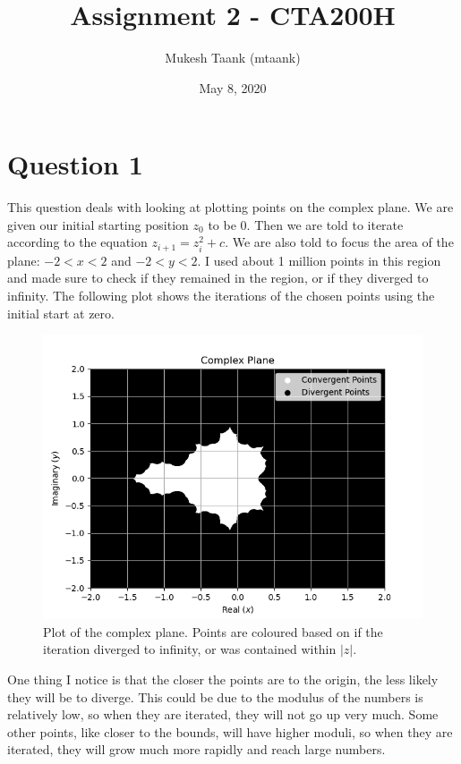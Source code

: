 \documentclass{article}
\title{Assignment 2 - CTA200H}
\author{Mukesh Taank (mtaank)}
\date{May 8, 2020}
\begin{document}
\maketitle

\section*{Question 1}

This question deals with looking at plotting points on the complex plane. 
We are given our initial starting position $z_0$ to be 0.
Then we are told to iterate according to the equation $z_{i + 1} = z_i^2 + c$.
We are also told to focus the area of the plane: $-2 < x < 2$ and $-2 < y < 2$.
I used about 1 million points in this region and made sure to check if they remained in the region, or if they diverged to infinity.
The following plot shows the iterations of the chosen points using the initial start at zero.

\begin{figure}[!htb]
    \centering
    \includegraphics[scale=0.9]{Q1_updated plot.png}
    \caption{Plot of the complex plane. Points are coloured based on if the iteration diverged to infinity, or was contained within $|z|$.}
    \label{fig:Q1_plot1.png}
\end{figure}

One thing I notice is that the closer the points are to the origin, the less likely they will be to diverge. This could be due to the modulus of the numbers is relatively low, so when they are iterated, they will not go up very much. Some other points, like closer to the bounds, will have higher moduli, so when they are iterated, they will grow much more rapidly and reach large numbers.
\newpage
\end{document}
